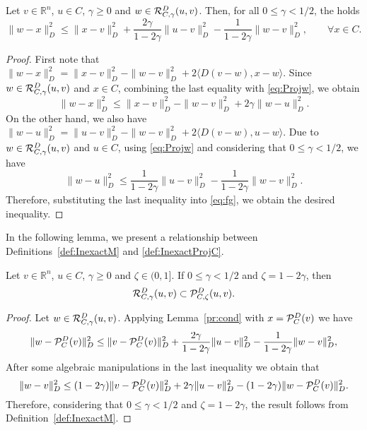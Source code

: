 \begin{lemma} \label{pr:cond}
	Let $v \in {\mathbb R}^n$, $u \in C$, $\gamma \geq 0$ and $w\in {\cal R}_{C,\gamma}^{D}(u, v)$. Then,  for all $0 \leq \gamma <1/2$, the holds
	$$
\displaystyle \|w-x\|_{D}^2 \leq \|x-v\|_{D}^2 + \frac{2\gamma}{1-2\gamma}\|u-v\|_{D}^2- \frac{1}{1-2\gamma}\|w-v\|_{D}^2, \qquad \forall x \in C.
	$$
\end{lemma}
\begin{proof}
	First note that $\|w-x\|_{D}^2 = \|x-v\|_{D}^2 - \|w-v\|_{D}^2 + 2 \langle D(v-w), x-w \rangle$. Since $w \in {\cal R}_{C,\gamma}^{D}(u, v)$ and $x \in C$, combining the last equality with \eqref{eq:Projw}, we obtain
	\begin{equation} \label{eq:fg}
		\|w-x\|_{D}^2 \leq \|x-v\|_{D}^2 - \|w-v\|_{D}^2  + 2\gamma \|w-u\|_{D}^2.
	\end{equation}
	On the other hand, we also have $\|w-u\|_{D}^2=\|u-v\|_{D}^2 - \|w-v\|_{D}^2 +  2 \langle D(v-w), u-w \rangle$. Due to $w\in {\cal R}_{C,\gamma}^{D}(u, v)$ and $u \in C$, using \eqref{eq:Projw} and considering that  $0 \leq \gamma < 1/2$, we have
	$$
		\|w-u\|_{D}^2 \leq \frac{1}{1-2\gamma}\|u-v\|_{D}^2 - \frac{1}{1-2\gamma} \|w-v\|_{D}^2.
	$$
	Therefore, substituting the last inequality into   \eqref{eq:fg}, we obtain the  desired inequality.
\end{proof}
In the following  lemma, we present a  relationship between   Definitions~\ref{def:InexactM} and \ref{def:InexactProjC}.
\begin{lemma} \label{pr:condrip}
	Let $v \in {\mathbb R}^n$, $u \in C$, $\gamma \geq 0$  and $\zeta\in (0, 1]$.  If  $0 \leq \gamma <1/2$ and $\zeta=1-2\gamma$, then
	$$
		{\cal R}_{C,\gamma}^{D}(u, v) \subset {\cal P}_{C,\zeta}^{D}(u, v).
	$$
\end{lemma}
\begin{proof}
	Let $w\in {\cal R}_{C,\gamma}^{D}(u, v)$. Applying Lemma~\ref{pr:cond} with  $x={\cal P}_{C}^{D}(v)$ we have
	$$
		\|w-{\cal P}_{C}^{D}(v)\|_{D}^2 \leq \|v-{\cal P}_{C}^{D}(v)\|_{D}^2 + \frac{2\gamma}{1-2\gamma}\|u-v\|_{D}^2- \frac{1}{1-2\gamma}\|w-v\|_{D}^2,
	$$
	After some algebraic manipulations in the last inequality we obtain that
	$$
		\|w-v\|_{D}^2 \leq (1-2\gamma)\|v-{\cal P}_{C}^{D}(v)\|_{D}^2 + 2\gamma\|u-v\|_{D}^2- (1-2\gamma)\|w-{\cal P}_{C}^{D}(v)\|_{D}^2.
	$$
	Therefore, considering that  $0 \leq \gamma <1/2$ and $\zeta=1-2\gamma$, the result follows from Definition~\ref{def:InexactM}.
\end{proof}

